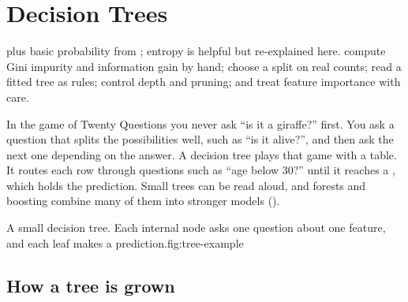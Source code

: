 \chapter{Decision Trees}
\label{ch:decision-trees}

\chapterguide%
  { plus basic probability from ; entropy is helpful but re-explained here.}
  {compute Gini impurity and information gain by hand; choose a split on real counts; read a fitted tree as rules; control depth and pruning; and treat feature importance with care.}

In the game of Twenty Questions you never ask ``is it a giraffe?'' first. You ask a question that splits the possibilities well, such as ``is it alive?'', and then ask the next one depending on the answer. A decision tree plays that game with a table. It routes each row through questions such as ``age below 30?'' until it reaches a , which holds the prediction. Small trees can be read aloud, and forests and boosting combine many of them into stronger models ().

\begin{utpfig}{A small decision tree. Each internal node asks one question about one feature, and each leaf makes a prediction.}{fig:tree-example}
\end{utpfig}

\section{How a tree is grown}
\label{sec:decision-tree}

